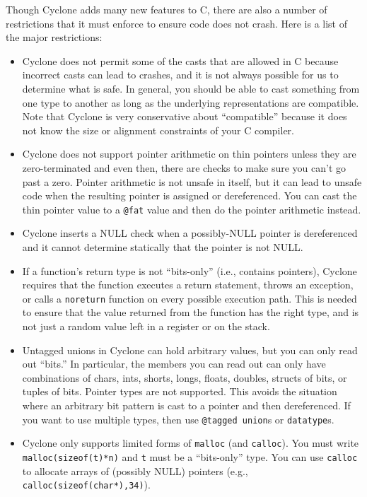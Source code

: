 Though Cyclone adds many new features to C, there are also a number
of restrictions that it must enforce to ensure code does not crash.
Here is a list of the major restrictions:
\begin{itemize}
\item Cyclone does not permit some of the casts that are allowed in C because
  incorrect casts can lead to crashes, and it is not always possible
  for us to determine what is safe.  In general, you should be
  able to cast something from one type to another as long as the
  underlying representations are compatible.  Note that Cyclone is
  very conservative about ``compatible'' because it does not know
  the size or alignment constraints of your C compiler.  

\item Cyclone does not support pointer arithmetic on thin
  pointers unless they are zero-terminated and even then,
  there are checks to make sure you can't go past a zero.  Pointer 
  arithmetic is not unsafe in itself, but
  it can lead to unsafe code when the resulting pointer is assigned or
  dereferenced.  You can cast the thin pointer value to a
  \texttt{@fat} value and then do the pointer arithmetic instead.

\item Cyclone inserts a NULL check when a possibly-NULL pointer is
  dereferenced and it cannot determine statically that the pointer is
  not NULL\@.

\item If a function's return type is not ``bits-only'' (i.e., contains
  pointers), Cyclone requires that the function 
  executes a return statement, throws an
  exception, or calls a \texttt{noreturn} function on every possible 
  execution path. This is needed to
  ensure that the value returned from the function has the right type,
  and is not just a random value left in a register or on the stack.

\item Untagged unions in Cyclone can hold arbitrary values, but you
  can only read out ``bits.''  In particular, the members you can
  read out can only have combinations of chars, ints, shorts, longs, floats,
  doubles, structs of bits, or tuples of bits. Pointer types are not
  supported.  This avoids the situation where an arbitrary bit pattern
  is cast to a pointer and then dereferenced. If you want to use
  multiple types, then use \texttt{@tagged union}s or \texttt{datatype}s.

\item Cyclone only supports limited forms of \texttt{malloc} (and
  \texttt{calloc}).  You must write \texttt{malloc(sizeof(t)*n)}
  and \texttt{t} must be a ``bits-only'' type.  
  You can use \texttt{calloc} to allocate arrays of (possibly NULL)
  pointers (e.g., \texttt{calloc(sizeof(char*),34)}).  


\end{itemize}
